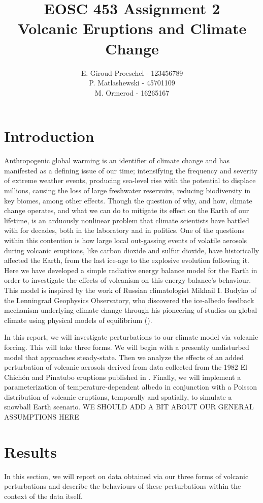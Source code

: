 \documentclass{article}
\title{EOSC 453 Assignment 2\\
\large Volcanic Eruptions and Climate Change}
\author{
    E. Giroud-Proeschel - 123456789 \\
    P. Matlashewski - 45701109\\
    M. Ormerod - 16265167
}
\begin{document}
\maketitle
\tableofcontents

\newpage

\section{Introduction}
Anthropogenic global warming is an identifier of climate change and has
manifested as a defining issue of our time; intensifying the frequency and
severity of extreme weather events, producing sea-level rise with the potential
to displace millions, causing the loss of large freshwater reservoirs, reducing
biodiversity in key biomes, among other effects. Though the question of why, and
how, climate change operates, and what we can do to mitigate its effect on the
Earth of our lifetime, is an arduously nonlinear problem that climate scientists
have battled with for decades, both in the laboratory and in politics. One of
the questions within this contention is how large local out-gassing events of
volatile aerosols during volcanic eruptions, like carbon dioxide and sulfur
dioxide, have historically affected the Earth, from the last ice-age to the
explosive evolution following it. Here we have developed a simple radiative
energy balance model for the Earth in order to investigate the effects of
volcanism on this energy balance's behaviour. This model is inspired by the
work of Russian climatologist Mikhail I. Budyko of the Lenningrad Geophysics
Observatory, who discovered the ice-albedo feedback mechanism underlying climate
change through his pioneering of studies on global climate using physical models
of equilibrium (\cite{budyko_albedo}).

In this report, we will investigate perturbations to our climate model via
volcanic forcing. This will take three forms. We will begin with a presently
undisturbed model that approaches steady-state. Then we analyze the effects of
an added perturbation of volcanic aerosols derived from data collected from the
1982 El Chichón and Pinatubo eruptions published in \cite{robock}. Finally, we
will implement a parameterization of temperature-dependent albedo in conjunction
with a Poisson distribution of volcanic eruptions, temporally and spatially, to
simulate a snowball Earth scenario.
WE SHOULD ADD A BIT ABOUT OUR GENERAL ASSUMPTIONS HERE

\section{Results}
\label{section:results}
In this section, we will report on data obtained via our three forms of volcanic
perturbations and describe the behaviours of these perturbations within the
context of the data itself.
\end{document}
